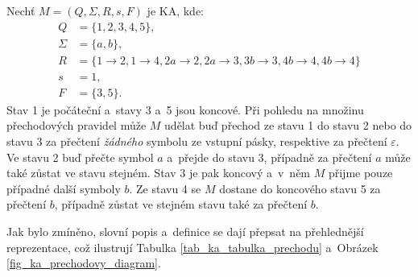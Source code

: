 \begin{example}\label{example_ka}
    Nechť $M = (Q, \Sigma, R, s, F)$ je KA, kde:
    \begin{align*}
        Q &= \{1, 2, 3, 4, 5\}, \\
        \Sigma &= \{a, b\}, \\
        R &= \{  1  \rightarrow 2, 1  \rightarrow 4,  2a \rightarrow 2, 2a \rightarrow 3, 3b \rightarrow 3, 4b \rightarrow 4, 4b \rightarrow 4 \} \\
        s &= 1, \\
        F &= \{3, 5\}.
    \end{align*}
    Stav 1 je počáteční a~stavy 3 a~5 jsou koncové.
    Při pohledu na množinu přechodových pravidel může $M$ udělat buď přechod ze stavu 1 do stavu 2 nebo do stavu 3 za přečtení \emph{žádného} symbolu ze vstupní pásky, respektive za přečtení $\varepsilon$. 
    Ve stavu 2 buď přečte symbol $a$ a~přejde do stavu 3, případně za přečtení $a$ může také zůstat ve stavu stejném.
    Stav 3 je pak koncový a~v~něm $M$ přijme pouze případné další symboly $b$.
    Ze stavu 4 se $M$ dostane do koncového stavu 5 za přečtení $b$, případně zůstat ve stejném stavu také za přečtení $b$.
    
    Jak bylo zmíněno, slovní popis a~definice se dají přepsat na přehlednější reprezentace, což ilustrují Tabulka \ref{tab_ka_tabulka_prechodu} a~Obrázek \ref{fig_ka_prechodovy_diagram}. 


\end{example}
